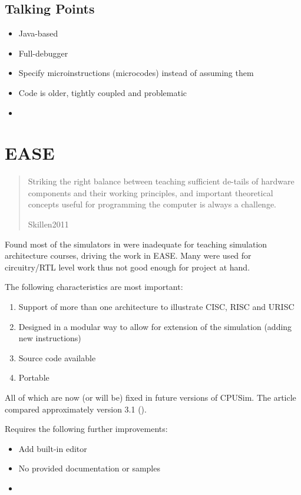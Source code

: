 \subsection{Talking Points}

\begin{itemize}
\item Java-based
\item Full-debugger
\item Specify microinstructions (microcodes) instead of assuming them
\item Code is older, tightly coupled and problematic
\item 
\end{itemize}

\section{EASE}

\cite{Skillen2011}

\blockquote[Skillen2011]{Striking the right balance between teaching sufficient de-tails of hardware components and their working principles, and important theoretical concepts useful for programming the computer is always a challenge.}

Found most of the simulators in \cite{Nikolic2009} were inadequate for teaching simulation architecture courses, driving the work in EASE. Many were used for circuitry/RTL level work thus not good enough for project at hand. 

The following characteristics are most important: 

\begin{enumerate}
\item Support of more than one architecture to illustrate CISC, RISC and URISC
\item Designed in a modular way to allow for extension of the simulation (adding new instructions)
\item Source code available
\item Portable
\end{enumerate}

All of which are now (or will be) fixed in future versions of CPUSim. The article compared approximately version 3.1 (\cite{Skrien2001}). 

Requires the following further improvements: 

\begin{itemize}
\item Add built-in editor
\item No provided documentation or samples
\item 
\end{itemize}

